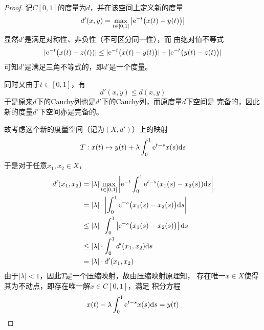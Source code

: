 \documentclass[cn]{homework}
\begin{document}
    \problem
    \begin{proof}
        记$C[0,1]$的度量为$d$，并在该空间上定义新的度量
        \[d'(x,y)=\max_{t\in[0,1]}\left|\mathrm e^{-t}\big(x(t)-y(t)\big)\right|\]
        显然$d'$是满足对称性、非负性（不可区分同一性），而
        由绝对值不等式
        \[|\mathrm e^{-t}\big(x(t)-z(t))|\leq
        |\mathrm e^{-t}\big(x(t)-y(t)\big)|+|\mathrm e^{-t}\big(y(t)-z(t)\big)|\]
        可知$d'$是满足三角不等式的，即$d'$是一个度量。

        同时又由于$t\in[0,1]$，有
        \[d'(x,y)\leq d(x,y)\]
        于是原来$d$下的Cauchy列也是$d'$下的Cauchy列，而原度量$d$下空间是
        完备的，因此新的度量$d'$下空间亦是完备的。

        故考虑这个新的度量空间（记为$(X,d')$）上的映射
        \[T:x(t)\mapsto y(t)+\lambda\int_0^1\mathrm e^{t-s}x(s)\mathrm d s\]
        于是对于任意$x_1,x_2\in X$，
        \[\begin{aligned}
            d'(x_1,x_2)&=|\lambda|\max_{t\in[0,1]}
            \left|\mathrm e^{-t}\int_0^1\mathrm e^{t-s}(x_1(s)-x_2(s))\mathrm d s\right|\\
            &=|\lambda|\cdot
            \left|\int_0^1\mathrm e^{-s}\big(x_1(s)-x_2(s)\big)\mathrm d s\right|\\
            &\leq|\lambda|\cdot
            \int_0^1\left|\mathrm e^{-s}\big(x_1(s)-x_2(s)\big)\right|\mathrm d s\\
            &\leq|\lambda|\cdot\int_0^1d'(x_1,x_2)\mathrm d s\\
            &=|\lambda|\cdot d'(x_1,x_2)
        \end{aligned}\]
        由于$|\lambda|<1$，因此$T$是一个压缩映射，故由压缩映射原理知，
        存在唯一$x\in X$使得其为不动点，即存在唯一解$x\in C[0,1]$，满足
        积分方程
        \[x(t)-\lambda\int_0^1\mathrm e^{t-s}x(s)\mathrm d s=y(t)\]
    \end{proof}
\end{document}
